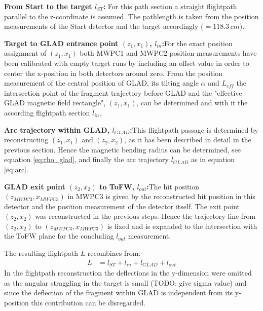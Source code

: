 \begin{description}
\item \textbf{From Start to the target $l_{ST}$:} For this path section a straight flightpath parallel to the z-coordinate is assumed. The pathlength is taken from the position measurements of the Start detector and the target accordingly ($=118.3\,cm$). 
\item \textbf{Target to GLAD entrance point $(z_1,x_1)$, $l_{in}$:}For the  exact position assignment of $(z_1,x_1)$ both MWPC1 and MWPC2 position measurements have been calibrated with empty target runs by including an offset value in order to center the x-position in both detectors around zero. From the position measurement of the central position of GLAD, its tilting angle $\alpha$ and $L_{eff}$ the intersection point of the fragment trajectory before GLAD and the "effective GLAD magnetic field rectangle", $(z_1,x_1)$, can be determined and with it the according flightpath section $l_{in}$.
\item \textbf{Arc trajectory within GLAD, ${l_{GLAD}}$:}This flightpath passage is determined by reconstructing $(z_1,x_1)$ and $(z_2,x_2)$, as it has been described in detail in the previous section. Hence the magnetic bending radius can be determined, see equation \ref{eq:rho_glad}, and finally the arc trajectory ${l_{GLAD}}$ as in equation \ref{eq:arc}.
\item \textbf{GLAD exit point $(z_2,x_2)$ to ToFW, $l_{out}$:}The hit position $(z_{MWPC3},x_{MWPC3})$ in MWPC3 is given by the reconstructed hit position in this detector and the position measurement of the detector itself. The exit point $(z_2,x_2)$ was reconstructed in the previous steps. Hence the trajectory line from $(z_2,x_2)$ to $(z_{MWPC3},x_{MWPC3})$ is fixed and is expanded to the intersection with the ToFW plane for the concluding $l_{out}$ measurement.  
\end{description}
The resulting flightpath $L$ recombines from:
\begin{align*}
L &= l_{ST}+l_{in}+l_{GLAD} + l_{out} 
\end{align*}
In the flightpath reconstruction the deflections in the y-dimension were omitted as the angular straggling in the target is small (TODO: give sigma value) and since the deflection of the fragment within GLAD is independent from its  y-position this contribution can be disregarded.


